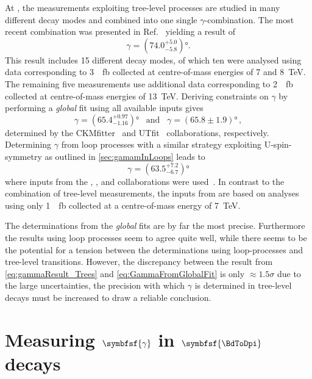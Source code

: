At \lhcb, the measurements exploiting tree-level processes are studied in many different decay modes and combined into one single $\gamma$-combination.
The most recent combination was presented in Ref.~\cite{GammCombo} yielding a result of
\begin{equation}
\gamma=\left(74.0^{+5.0}_{-5.8}\right)\!\si{\degree}.\label{eq:gammaResult_Trees}
\end{equation}
This result includes \num{15} different decay modes, of which ten were analysed using data corresponding to \SI{3}{\per\femto\barn} collected at centre-of-mass energies of \num{7} and \SI{8}{\tera\electronvolt}.
The remaining five measurements use additional data corresponding to \SI{2}{\per\femto\barn} collected at centre-of-mass energies of \SI{13}{\tera\electronvolt}.
Deriving constraints on $\gamma$ by performing a \emph{global} fit using all available inputs gives
\begin{equation}
\gamma=\left(65.4^{+0.97}_{-1.16}\right)\!\si{\degree}\,\,\,\,\,\text{and}\,\,\,\,\,\gamma=\left(65.8\pm1.9\right)\!\si{\degree}\,,\label{eq:GammaFromGlobalFit}
\end{equation}
determined by the CKMfitter~\cite{CKMfitter2015} and UTfit~\cite{UTfit-UT} collaborations, respectively.
Determining $\gamma$ from loop processes with a similar strategy exploiting U-spin-symmetry as outlined in \cref{sec:gamamInLoops} leads to
\begin{equation}
\gamma=\left(63.5^{+7.2}_{-6.7}\right)\!\si{\degree}\label{eq:gammaResult_Loops}
\end{equation}
where inputs from the \babar, \belle, \cdf and \lhcb collaborations were used~\cite{Aaij:2014xba}. In contrast to the combination of tree-level measurements, the inputs from \lhcb are based on analyses using only \SI{1}{\per\femto\barn} collected at a centre-of-mass energy of \SI{7}{\tera\electronvolt}.

The determinations from the \emph{global} fits are by far the most precise.
Furthermore the results using loop processes seem to agree quite well, while there seems to be the potential for a tension between the determinations using loop-processes and tree-level transitions.
However, the discrepancy between the result from \cref{eq:gammaResult_Trees} and \cref{eq:GammaFromGlobalFit} is only $\approx1.5\sigma$ due to the large uncertainties, \ie the precision with which $\gamma$ is determined in tree-level decays must be increased to draw a reliable conclusion.

\section[head={Measuring $\gamma$ in $\BdToDpi$ decays},tocentry={Measuring $\gamma$ in $\BdToDpi$ decays}]{Measuring $\symbfsf{\gamma}$ in $\symbfsf{\BdToDpi} $ decays}
\label{sec:GammaInBd2Dpi}

